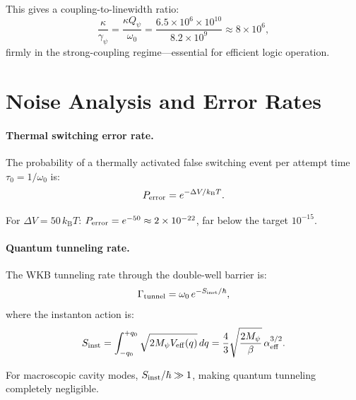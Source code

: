 \documentclass[12pt,a4paper,twoside]{article}
\newcommand{\kB}{k_{\mathrm{B}}}
\begin{document}
\begin{appendices}
This gives a coupling-to-linewidth ratio:
\begin{equation}
\frac{\kappa}{\gamma_\psi} = \frac{\kappa Q_\psi}{\omega_0} = \frac{6.5 \times 10^6 \times 10^{10}}{8.2 \times 10^9} \approx 8 \times 10^6,
\end{equation}
firmly in the strong-coupling regime---essential for efficient logic operation.

\section{Noise Analysis and Error Rates}\label{app:noise}

\paragraph{Thermal switching error rate.} The probability of a thermally activated false switching event per attempt time $\tau_0 = 1/\omega_0$ is:
\begin{equation}
P_{\rm error} = e^{-\Delta V / \kB T}.
\end{equation}

For $\Delta V = 50\,\kB T$: $P_{\rm error} = e^{-50} \approx 2 \times 10^{-22}$, far below the target $10^{-15}$.

\paragraph{Quantum tunneling rate.} The WKB tunneling rate through the double-well barrier is:
\begin{equation}
\Gamma_{\rm tunnel} = \omega_0\,e^{-S_{\rm inst}/\hbar},
\end{equation}
where the instanton action is:
\begin{equation}
S_{\rm inst} = \int_{-q_0}^{+q_0}\sqrt{2M_\psi V_{\rm eff}(q)}\,dq = \frac{4}{3}\sqrt{\frac{2M_\psi}{\beta}}\,\alpha_{\rm eff}^{3/2}.
\end{equation}

For macroscopic cavity modes, $S_{\rm inst}/\hbar \gg 1$, making quantum tunneling completely negligible.

\end{appendices}
\end{document}

